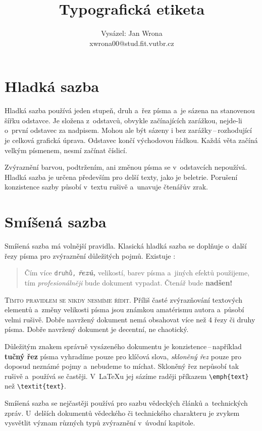 \documentclass[a4paper, 10pt, twocolumn]{article}[26.02.2012]
\title{Typografická etiketa}
\author{Vysázel: Jan Wrona\\xwrona00@stud.fit.vutbr.cz}
\date{}
\begin{document}
\maketitle
\section{Hladká sazba}\label{hladka}
Hladká sazba používá jeden stupeň, druh a~řez písma a~je sázena na stanovenou šířku odstavce.
Je složena z~odstav\-ců, obvykle začínajících zarážkou, nejde-li o~první odstavec za nadpisem.
Mohou ale být sázeny i bez zarážky\,--\,rozho\-dující je celková grafická úprava.
Odstavec končí východovou řádkou. Každá věta začíná velkým písmenem, nesmí začínat číslicí.

Zvýraznění barvou, podtržením, ani změnou písma se v~odstavcích nepoužívá. Hladká sazba je
určena především pro delší texty, jako je beletrie. Porušení konzistence sazby působí
v~textu rušivě a~unavuje čtenářův zrak.
\section{Smíšená sazba}\label{smisena}
Smíšená sazba má volnější pravidla. Klasická hladká sazba se doplňuje o~další řezy
písma pro zvýraznění důležitých pojmů. Existuje :

\begin{quotation}
Čím více \texttt{druhů,} {\bf\emph{řezů,}} velikostí, barev písma {\selectfont a~jiných efektů}
použi{\large jeme, }tím \emph{profesionálněji} {\Large bude} dokument vypadat. Čtenář {\tiny bude} {\bf nadšen!}
\end{quotation}

\textsc{Tímto pravidlem se nikdy nesmíme řídit.} Příliš časté zvýrazňování textových
elementů a~změny velikos\-ti písma jsou známkou amatérismu autora a~působí velmi rušivě.
Dobře navržený dokument nemá obsahovat více než 4 řezy či druhy písma. Dobře navržený
dokument je decentní, ne chaotický.

Důležitým znakem správně vysázeného dokumentu je konzistence\,--\,například {\bf tučný řez}
písma vyhradíme pou\-ze pro klíčová slova, \emph{skloněný řez} pouze pro doposud neznámé
pojmy a~nebudeme to míchat. Skloněný řez nepůsobí tak rušivě a~používá se častěji. V~\LaTeX u
jej sázíme raději příkazem \verb|\emph{text}| než \verb|\textit{text}|.

Smíšená sazba se nejčastěji používá pro sazbu vědeckých článků a~technických zpráv.
U~delších dokumentů vědeckého či technického charakteru je zvykem vysvětlit význam
různých typů zvýraznění v~úvodní kapitole.
\end{document}
